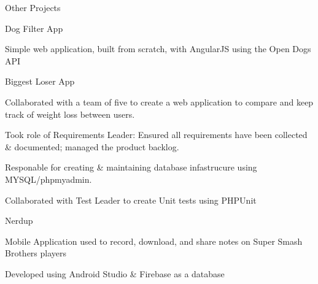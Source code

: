 \documentclass{resume} %
\begin{document}
\begin{rSection}{Other Projects}

    \begin{rSubsection}{Dog Filter App}{}{}{}
        \item Simple web application, built from scratch, with AngularJS using the Open Dogs API
    \end{rSubsection}

    \begin{rSubsection}{Biggest Loser App}{}{}{}
        \item Collaborated with a team of five to create a web application to compare and keep track of weight loss between users.
        \item Took role of Requirements Leader:  Ensured all requirements have been collected \& documented; managed the product backlog.
        \item Responable for creating \& maintaining database infastrucure using MYSQL/phpmyadmin.
        \item Collaborated with Test Leader to create Unit tests using PHPUnit
    \end{rSubsection}

    \begin{rSubsection}{Nerdup}{}{}{}
        \item Mobile Application used to record, download, and share notes on Super Smash Brothers players
        \item Developed using Android Studio \& Firebase as a database
    \end{rSubsection}

\end{rSection}

\end{document}
